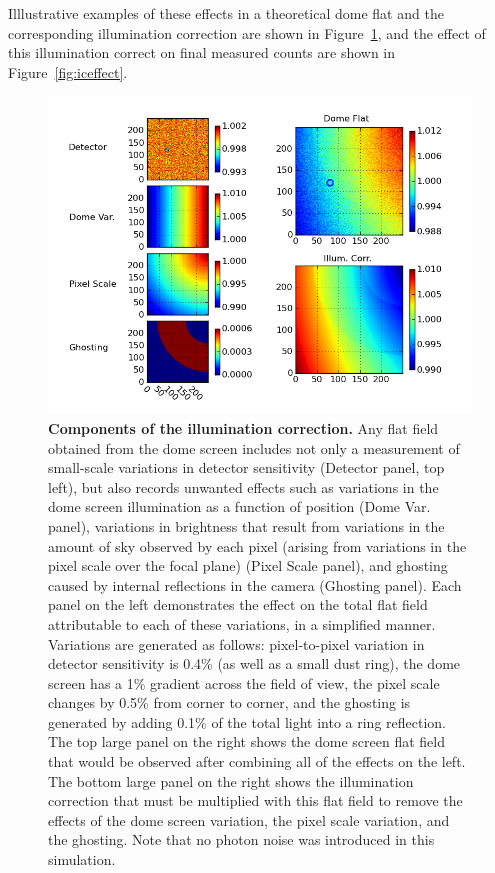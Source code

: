 \documentclass[12pt,preprint]{aastex}
\begin{document}
Illlustrative examples of these effects in a theoretical dome flat and
the corresponding illumination correction are shown in
Figure~\ref{fig:flatfield}, and the effect of this illumination
correct on final measured counts are shown in
Figure~\ref{fig:iceffect}.

\begin{figure}[htbp]
\includegraphics[width=6in]{flatfield_corr}
\caption{ {\small
{\bf Components of the illumination correction.}
Any flat field obtained from the dome screen includes not only a
measurement of small-scale variations in detector sensitivity
(Detector panel, top left), but
also records unwanted effects such as variations in the dome screen
illumination as a function of position (Dome Var. panel), variations in brightness that
result from variations in the amount of sky observed by each pixel
(arising from variations in the pixel scale over the focal plane)
(Pixel Scale panel), and
ghosting caused by internal reflections in the camera (Ghosting panel).
Each panel on the left demonstrates the effect on the total flat field
attributable to each of these variations, in a simplified manner. 
Variations are generated as follows: pixel-to-pixel variation in
detector sensitivity is 0.4\% (as well as a small dust ring), the dome
screen has a 1\% gradient across the field of view, the pixel scale
changes by 0.5\% from corner to corner, and the ghosting is generated
by adding 0.1\% of the total light into a ring reflection. 
The top large panel on the right shows the dome screen flat field that
would be observed after combining all of the effects on the left. The bottom large panel on
the right shows the illumination correction that must be multiplied with 
this flat field to remove the effects of the dome screen variation,
the pixel scale variation, and the ghosting.   Note that no photon noise was
introduced in this simulation. }}  \label{fig:flatfield}
\end{figure}
\end{document}
